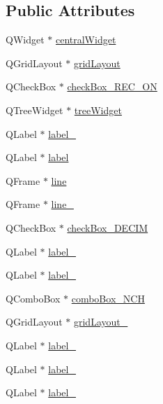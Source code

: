 \subsection*{Public Attributes}
\begin{DoxyCompactItemize}
\item 
Q\+Widget $\ast$ \hyperlink{class_ui___main_window_a30075506c2116c3ed4ff25e07ae75f81}{central\+Widget}
\item 
Q\+Grid\+Layout $\ast$ \hyperlink{class_ui___main_window_a525ed3c5fe0784ac502ee222fba4e205}{grid\+Layout}
\item 
Q\+Check\+Box $\ast$ \hyperlink{class_ui___main_window_a5a712f0294a7c1137b91e546a67d9cb7}{check\+Box\+\_\+\+R\+E\+C\+\_\+\+ON}
\item 
Q\+Tree\+Widget $\ast$ \hyperlink{class_ui___main_window_a082c92b8f4b52f2160ba8c58e94118c8}{tree\+Widget}
\item 
Q\+Label $\ast$ \hyperlink{class_ui___main_window_a663f728e6244926a795c6e6892673b1d}{label\+\_}
\item 
Q\+Label $\ast$ \hyperlink{class_ui___main_window_ad9c89133780f28e6efa2ec17ceb9cff5}{label}
\item 
Q\+Frame $\ast$ \hyperlink{class_ui___main_window_a16e802a7ebd4beb9d8aba858565e51b3}{line}
\item 
Q\+Frame $\ast$ \hyperlink{class_ui___main_window_add492bf5763815e82fba9ba9297c50e6}{line\+\_}
\item 
Q\+Check\+Box $\ast$ \hyperlink{class_ui___main_window_a6577339cac5354cd92212d8182b9b47d}{check\+Box\+\_\+\+D\+E\+C\+IM}
\item 
Q\+Label $\ast$ \hyperlink{class_ui___main_window_a78c7e10730b43c6700cd7216911ed76a}{label\+\_}
\item 
Q\+Label $\ast$ \hyperlink{class_ui___main_window_ad6bab8fb8903b8f41afea1218ee52695}{label\+\_}
\item 
Q\+Combo\+Box $\ast$ \hyperlink{class_ui___main_window_a60e6e7aea7048e8119b9cb05c2192070}{combo\+Box\+\_\+\+N\+CH}
\item 
Q\+Grid\+Layout $\ast$ \hyperlink{class_ui___main_window_a6b2a0c5f7e8ff2a87134908dd770d2d2}{grid\+Layout\+\_}
\item 
Q\+Label $\ast$ \hyperlink{class_ui___main_window_af183bfbfb9f38bbdd60caf92b15e23dc}{label\+\_}
\item 
Q\+Label $\ast$ \hyperlink{class_ui___main_window_a0e90c7e9ad77386881e0b264ddb9dd22}{label\+\_}
\item 
Q\+Label $\ast$ \hyperlink{class_ui___main_window_a13936e6f18b1c90402b3c7a3c92b6cdb}{label\+\_}

\end{DoxyCompactItemize}
